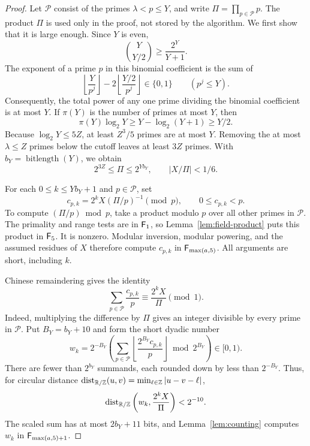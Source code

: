 \begin{proof}
Let $\mathcal P$ consist of the primes $\lambda<p\le Y$, and write
$\Pi=\prod_{p\in\mathcal P}p$.  The product $\Pi$ is used only in the
proof, not stored by the algorithm.  We first show that it is large
enough.  Since $Y$ is even,
\[
 \binom{Y}{Y/2}\ge\frac{2^Y}{Y+1}.
\]
The exponent of a prime $p$ in this binomial coefficient is the sum of
\[
 \left\lfloor\frac{Y}{p^j}\right\rfloor
 -2\left\lfloor\frac{Y/2}{p^j}\right\rfloor\in\{0,1\}
 \qquad(p^j\le Y).
\]
Consequently, the total power of any one prime dividing the binomial
coefficient is at most $Y$.  If $\pi(Y)$ is the number of primes at most
$Y$, then
\[
 \pi(Y)\log_2Y\ge Y-\log_2(Y+1)\ge Y/2.
\]
Because $\log_2Y\le5Z$, at least $Z^3/5$ primes are at most $Y$.
Removing the at most $\lambda\le Z$ primes below the cutoff leaves at
least $3Z$ primes.  With $b_Y=\operatorname{bitlength}(Y)$, we obtain
\begin{equation}\label{eq:crt-product-bounds}
 2^{3Z}\le\Pi\le2^{Yb_Y},\qquad |X/\Pi|<1/6.
\end{equation}

For each $0\le k\le Yb_Y+1$ and $p\in\mathcal P$, set
\begin{equation}\label{eq:crt-residues}
 c_{p,k}=2^kX(\Pi/p)^{-1}\pmod p,
 \qquad 0\le c_{p,k}<p.
\end{equation}
To compute $(\Pi/p)\bmod p$, take a product modulo $p$ over all other
primes in $\mathcal P$.  The primality and range tests are in
$\mathsf F_{1}$, so Lemma~\ref{lem:field-product} puts this product in
$\mathsf F_{5}$.  It is nonzero.  Modular inversion, modular powering,
and the assumed residues of $X$ therefore compute $c_{p,k}$ in
$\mathsf F_{\max(a,5)}$.  All arguments are short, including $k$.

Chinese remaindering gives the identity
\begin{equation}\label{eq:crt-circle-identity}
 \sum_{p\in\mathcal P}\frac{c_{p,k}}p
 \equiv\frac{2^kX}{\Pi}\pmod1.
\end{equation}
Indeed, multiplying the difference by $\Pi$ gives an integer divisible
by every prime in $\mathcal P$.  Put $B_Y=b_Y+10$ and form the short
dyadic number
\[
 w_k=2^{-B_Y}\left(
 \sum_{p\in\mathcal P}
 \left\lfloor\frac{2^{B_Y}c_{p,k}}p\right\rfloor
 \bmod 2^{B_Y}\right)\in[0,1).
\]
There are fewer than $2^{b_Y}$ summands, each rounded down by less than
$2^{-B_Y}$.  Thus, for circular distance
$\operatorname{dist}_{\mathbb R/\mathbb Z}(u,v)=\min_{\ell\in\mathbb Z}|u-v-\ell|$,
\begin{equation}\label{eq:crt-circle-error}
 \operatorname{dist}_{\mathbb R/\mathbb Z}
 \left(w_k,\frac{2^kX}{\Pi}\right)<2^{-10}.
\end{equation}
The scaled sum has at most $2b_Y+11$ bits, and
Lemma~\ref{lem:counting} computes $w_k$ in
$\mathsf F_{\max(a,5)+1}$.


\end{proof}

